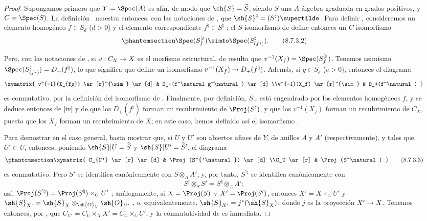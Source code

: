 \documentclass[oneside,10pt]{amsart}
\makeatletter
\renewcommand{\geq}{\geqslant}
\newcommand{\ega@arrow}[2]{\mathchoice{#1}{#2}{#2}{#2}}
\renewcommand{\to}{\ega@arrow{\longrightarrow}{\rightarrow}}
\newcommand{\oldpage}[2][]{\marginnote{\normalfont\footnotesize\textbf{#1}~|~#2}\ignorespaces}
\let\EGAOriginalLabel\label
\renewcommand{\label}[1]{\phantomsection\EGAOriginalLabel{#1}}
\makeatother
\begin{document}
\begin{proof}
Supongamos primero que $Y=\Spec(A)$ es afín, de modo que $\sh{S}=\widetilde{S}$, siendo $S$ una $A$-álgebra graduada en grados positivos, y $C=\Spec(S)$.
La definición~ muestra entonces, con las notaciones de , que $\sh{S}^\natural=(S^\natural)\supertilde$.
Para definir , consideremos un elemento homogéneo $f\in S_d$ ($d>0$) y el elemento correspondiente $f^\natural\in S^\natural$ ;
el $S$-isomorfismo de  define entonces un $C$-isomorfismo
\[
\label{II.8.7.3.2}
  \Spec(S_f^\geq) \simto \Spec(S_{(f^\natural)}^\natural).
\tag{8.7.3.2}
\]

\oldpage[II]{175}
Pero, con las notaciones de , si $v:C_X\to X$ es el morfismo estructural, de  resulta que $v^{-1}(X_f)=\Spec(S_f^\geq)$.
Tenemos asimismo $\Spec(S_{(f^\natural)}^\natural)=D_+(f^\natural)$, lo que significa que  define un isomorfismo $v^{-1}(X_f)\to D_+(f^\natural)$.
Además, si $g\in S_e$ ($e>0$), entonces el diagrama
\[
  \xymatrix{
    v^{-1}(X_{fg})
      \ar[r]^{\sim}
      \ar[d]
  & D_+(f^\natural g^\natural)
      \ar[d]
  \\v^{-1}(X_f)
      \ar[r]^{\sim}
  & D_+(f^\natural)
  }
\]
es conmutativo, por la definición del isomorfismo de .
Finalmente, por definición, $S_+$ está engendrado por los elementos homogéneos $f$, y se deduce entonces de [iv] y de  que los $D_+(f^\natural)$ forman un recubrimiento de $\Proj(S^\natural)$, y que los $v^{-1}(X_f)$ forman un recubrimiento de $C_X$, puesto que los $X_f$ forman un recubrimiento de $X$;
en este caso, hemos definido así el isomorfismo .

Para demostrar  en el caso general, basta mostrar que, si $U$ y $U'$ son abiertos afines de $Y$, de anillos $A$ y $A'$ (respectivamente), y tales que $U'\subset U$, entonces, poniendo $\sh{S}|U=\widetilde{S}$ y $\sh{S}|U'=\widetilde S'$, el diagrama
\[
\label{II.8.7.3.3}
  \xymatrix{
    C_{U'}
      \ar[r]
      \ar[d]
  & \Proj(S^{'\natural})
      \ar[d]
  \\C_U
      \ar[r]
  & \Proj(S^\natural)
  }
\tag{8.7.3.3}
\]
es conmutativo.
Pero $S'$ se identifica canónicamente con $S\otimes_A A'$, y, por tanto, $S^{'\natural}$ se identifica canónicamente con
\[
  S^\natural \otimes_S S' = S^\natural \otimes_A A';
\]
así, $\Proj(S^{'\natural}) = \Proj(S^\natural)\times_U U'$ ;
análogamente, si $X=\Proj(S)$ y $X'=\Proj(S')$, entonces $X'=X\times_U U'$ y $\sh{S}_{X'}=\sh{S}_X\otimes_{\sh{O}_U}\sh{O}_{U'}$ , o, equivalentemente, $\sh{S}_{X'}=j^*(\sh{S}_X)$, donde $j$ es la proyección $X'\to X$.
Tenemos entonces, por , que $C_{U'} = C_U\times_X X' = C_U\times_U U'$, y la conmutatividad de  es inmediata.
\end{proof}
\end{document}
